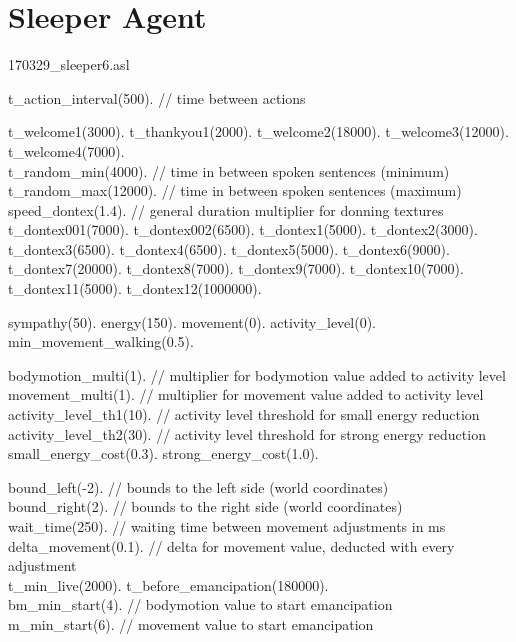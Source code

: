 \documentclass[draft,final]{vutinfth} %
\begin{document}
\section{Sleeper Agent}
{\ttfamily\scriptsize\raggedright
170329\_sleeper6.asl

t\_action\_interval(500).     // time between actions

t\_welcome1(3000).
t\_thankyou1(2000).
t\_welcome2(18000).
t\_welcome3(12000).
t\_welcome4(7000).\\
t\_random\_min(4000).         // time in between spoken sentences (minimum)\\
t\_random\_max(12000).        // time in between spoken sentences (maximum)\\

speed\_dontex(1.4).        // general duration multiplier for donning textures\\
t\_dontex001(7000).
t\_dontex002(6500).
t\_dontex1(5000).
t\_dontex2(3000).
t\_dontex3(6500).
t\_dontex4(6500).
t\_dontex5(5000).
t\_dontex6(9000).
t\_dontex7(20000).
t\_dontex8(7000).
t\_dontex9(7000).
t\_dontex10(7000).
t\_dontex11(5000).
t\_dontex12(1000000).

sympathy(50).
energy(150).
movement(0).
activity\_level(0).
min\_movement\_walking(0.5).

bodymotion\_multi(1).        // multiplier for bodymotion value added to activity level\\
movement\_multi(1).          // multiplier for movement value added to activity level\\

activity\_level\_th1(10).     // activity level threshold for small energy reduction\\
activity\_level\_th2(30).     // activity level threshold for strong energy reduction\\
small\_energy\_cost(0.3).
strong\_energy\_cost(1.0).

bound\_left(-2).             // bounds to the left side (world coordinates)\\
bound\_right(2).             // bounds to the right side (world coordinates)\\

wait\_time(250).             // waiting time between movement adjustments in ms\\
delta\_movement(0.1).        // delta for movement value, deducted with every adjustment\\

t\_min\_live(2000).
t\_before\_emancipation(180000).\\
bm\_min\_start(4).        // bodymotion value to start emancipation\\
m\_min\_start(6).         // movement value to start emancipation\\

}
\end{document}
